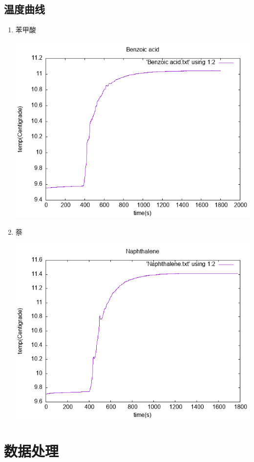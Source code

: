 \documentclass[11pt]{report}
\begin{document}
\section{温度曲线}
\label{sec:orgbfc646f}
\begin{enumerate}
\item 苯甲酸
\label{sec:org16b1aba}
\begin{center}
\includegraphics[width=.9\linewidth]{../img/苯甲酸.png}
\end{center}
\item 萘
\label{sec:orged11961}
\begin{center}
\includegraphics[width=.9\linewidth]{../img/萘.png}
\end{center}
\end{enumerate}
\chapter{数据处理}
\label{sec:orge117420}
\end{document}

